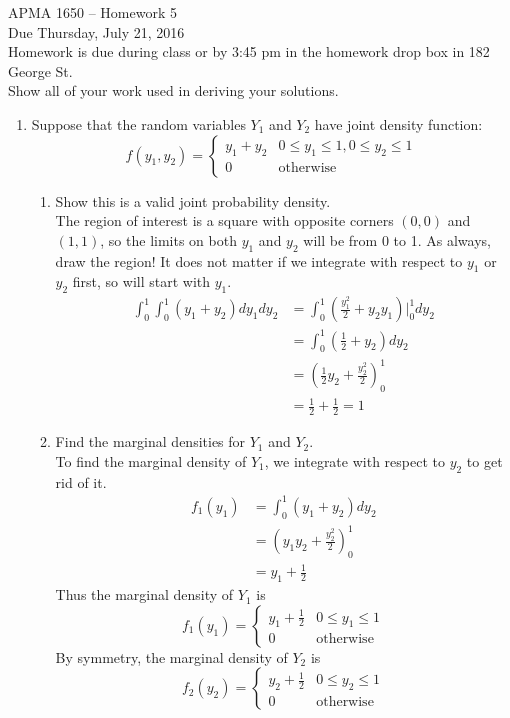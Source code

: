 \documentclass[12pt]{article}
\begin{document}
\title{}
\author{\vspace{-10ex} }

\begin{center}
{\LARGE APMA 1650 -- Homework 5}\\
\vspace{5mm}
{\large Due Thursday, July 21, 2016}\\
\vspace{5mm}
Homework is due during class or by 3:45 pm in the homework drop box in 182 George St.\\
Show all of your work used in deriving your solutions.
\end{center}

\begin{enumerate}

\item Suppose that the random variables $Y_1$ and $Y_2$ have joint density function:\
\[
f(y_1, y_2) = \begin{cases}
y_1 + y_2 & 0 \leq y_1 \leq 1, 0 \leq y_2 \leq 1 \\
0 & \text{otherwise}
\end{cases}
\]
\begin{enumerate}
\item Show this is a valid joint probability density. \\

The region of interest is a square with opposite corners $(0,0)$ and $(1,1)$, so the limits on both $y_1$ and $y_2$ will be from 0 to 1. As always, draw the region! It does not matter if we integrate with respect to $y_1$ or $y_2$ first, so will start with $y_1$.
\begin{align*}
\int_0^1 \int_0^1 (y_1 + y_2) dy_1 dy_2 &= \int_0^1 \left(\frac{y_1^2}{2} + y_2 y_1 \right) \Bigr|_0^1 dy_2\\
&= \int_0^1 \left(\frac{1}{2} + y_2 \right) dy_2 \\
&= \left( \frac{1}{2}y_2 + \frac{y_2^2}{2} \right)_0^1 \\
&= \frac{1}{2} + \frac{1}{2} = 1
\end{align*}

\item Find the marginal densities for $Y_1$ and $Y_2$.\\

To find the marginal density of $Y_1$, we integrate with respect to $y_2$ to get rid of it.
\begin{align*}
f_1(y_1) &= \int_0^1 (y_1 + y_2) dy_2 \\
&= \left( y_1 y_2 + \frac{y_2^2}{2} \right)_0^1 \\
&= y_1 + \frac{1}{2}
\end{align*}
Thus the marginal density of $Y_1$ is
\[
f_1(y_1) = \begin{cases}
y_1 + \frac{1}{2} & 0 \leq y_1 \leq 1 \\
0 & \text{otherwise}
\end{cases}
\]
By symmetry, the marginal density of $Y_2$ is
\[
f_2(y_2) = \begin{cases}
y_2 + \frac{1}{2} & 0 \leq y_2 \leq 1 \\
0 & \text{otherwise}
\end{cases}
\]


\end{enumerate}
\end{enumerate}
\end{document}
